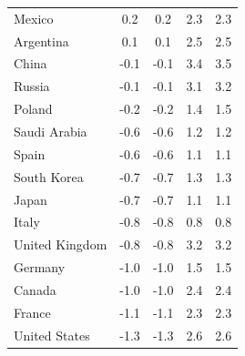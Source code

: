 \begin{tabular}[t]{lcccc}
Mexico & 0.2 & 0.2 & 2.3 & 2.3\\
Argentina & 0.1 & 0.1 & 2.5 & 2.5\\
China & -0.1 & -0.1 & 3.4 & 3.5\\
Russia & -0.1 & -0.1 & 3.1 & 3.2\\
Poland & -0.2 & -0.2 & 1.4 & 1.5\\
Saudi Arabia & -0.6 & -0.6 & 1.2 & 1.2\\
Spain & -0.6 & -0.6 & 1.1 & 1.1\\
South Korea & -0.7 & -0.7 & 1.3 & 1.3\\
Japan & -0.7 & -0.7 & 1.1 & 1.1\\
Italy & -0.8 & -0.8 & 0.8 & 0.8\\
United Kingdom & -0.8 & -0.8 & 3.2 & 3.2\\
Germany & -1.0 & -1.0 & 1.5 & 1.5\\
Canada & -1.0 & -1.0 & 2.4 & 2.4\\
France & -1.1 & -1.1 & 2.3 & 2.3\\
United States & -1.3 & -1.3 & 2.6 & 2.6\\
\bottomrule
\end{tabular}